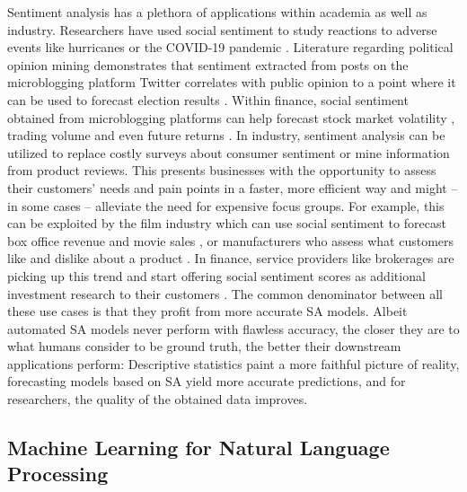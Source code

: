 Sentiment analysis has a plethora of applications within academia as well as industry. Researchers have used social sentiment to study reactions to adverse events like hurricanes  or the COVID-19 pandemic . Literature regarding political opinion mining demonstrates that sentiment extracted from posts on the microblogging platform Twitter correlates with public opinion to a point where it can be used to forecast election results .
Within finance, social sentiment obtained from microblogging platforms can help forecast stock market volatility , trading volume  and even future returns .
In industry, sentiment analysis can be utilized to replace costly surveys about consumer sentiment or mine information from product reviews. This presents businesses with the opportunity to assess their customers' needs and pain points in a faster, more efficient way and might -- in some cases -- alleviate the need for expensive focus groups. For example, this can be exploited by the film industry which can use social sentiment to forecast box office revenue and movie sales , or manufacturers who assess what customers like and dislike about a product .
In finance, service providers like brokerages are picking up this trend and start offering social sentiment scores as additional investment research to their customers \cite{ibkr-sentiment}. The common denominator between all these use cases is that they profit from more accurate SA models. Albeit automated SA models never perform with flawless accuracy, the closer they are to what humans consider to be ground truth, the better their downstream applications perform: Descriptive statistics paint a more faithful picture of reality, forecasting models based on SA yield more accurate predictions, and for researchers, the quality of the obtained data improves.
\subsection{Machine Learning for Natural Language Processing}
